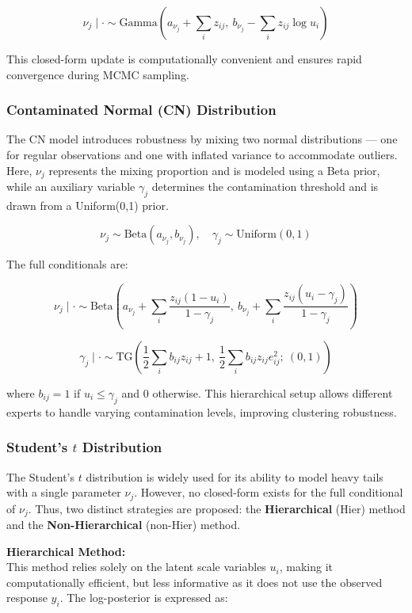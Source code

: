 \documentclass[10.5pt]{article} %
\begin{document}
\[
\nu_j \mid \cdot \sim \text{Gamma} \left( a_{\nu_j} + \sum_i z_{ij},\ b_{\nu_j} - \sum_i z_{ij} \log u_i \right)
\]

\noindent
This closed-form update is computationally convenient and ensures rapid convergence during MCMC sampling.

\subsubsection{Contaminated Normal (CN) Distribution} 
The CN model introduces robustness by mixing two normal distributions — one for regular observations and one with inflated variance to accommodate outliers. Here, $\nu_j$ represents the mixing proportion and is modeled using a Beta prior, while an auxiliary variable $\gamma_j$ determines the contamination threshold and is drawn from a Uniform(0,1) prior.

\[
\nu_j \sim \text{Beta}(a_{\nu_j}, b_{\nu_j}), \quad \gamma_j \sim \text{Uniform}(0,1)
\]

\noindent
The full conditionals are:

\[
\nu_j \mid \cdot \sim \text{Beta} \left( a_{\nu_j} + \sum_i \frac{z_{ij}(1 - u_i)}{1 - \gamma_j},\ b_{\nu_j} + \sum_i \frac{z_{ij}(u_i - \gamma_j)}{1 - \gamma_j} \right)
\]

\[
\gamma_j \mid \cdot \sim \text{TG} \left( \frac{1}{2} \sum_i b_{ij} z_{ij} + 1,\ \frac{1}{2} \sum_i b_{ij} z_{ij} e_{ij}^2;\ (0,1) \right)
\]

\noindent
where $b_{ij} = 1$ if $u_i \leq \gamma_j$ and $0$ otherwise. This hierarchical setup allows different experts to handle varying contamination levels, improving clustering robustness.

\subsubsection{Student’s $t$ Distribution} 
The Student’s $t$ distribution is widely used for its ability to model heavy tails with a single parameter $\nu_j$. However, no closed-form exists for the full conditional of $\nu_j$. Thus, two distinct strategies are proposed: the \textbf{Hierarchical} (Hier) method and the \textbf{Non-Hierarchical} (non-Hier) method.

\vspace{1em}

\noindent
\textbf{Hierarchical Method:} \\
\noindent
This method relies solely on the latent scale variables $u_i$, making it computationally efficient, but less informative as it does not use the observed response $y_i$. The log-posterior is expressed as:
\end{document}
